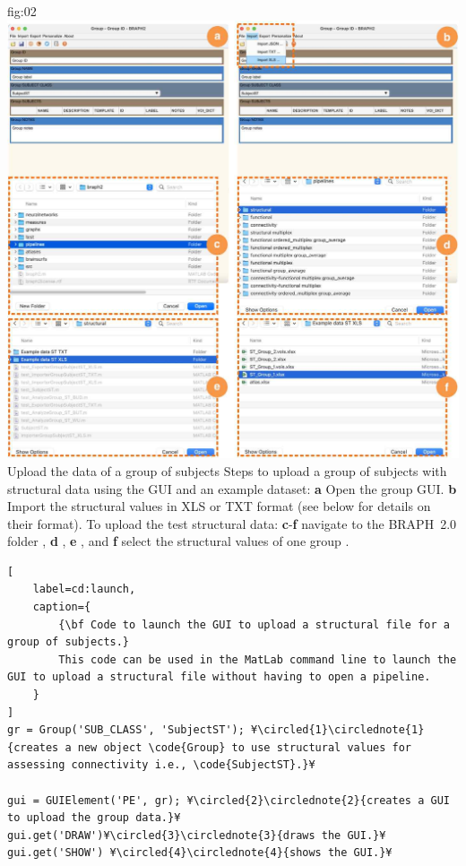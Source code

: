 \documentclass[justified]{tufte-handout}
\begin{document}
	{fig:02}
	{
	\includegraphics{fig02.jpg}
	}
	{Upload the data of a group of subjects}
	{
	Steps to upload a group of subjects with structural data using the GUI and an example dataset: 
	{\bf a} Open the group GUI.
	{\bf b} Import the structural values in XLS or TXT format (see below for details on their format).
	To upload the test structural data:
	{\bf c}-{\bf f} navigate to the BRAPH~2.0 folder , {\bf d} ,  {\bf e} , and {\bf f} select the structural values of one group .
	}

%
\begin{lstlisting}[
	label=cd:launch,
	caption={
		{\bf Code to launch the GUI to upload a structural file for a group of subjects.}
		This code can be used in the MatLab command line to launch the GUI to upload a structural file without having to open a pipeline.
	}
]
gr = Group('SUB_CLASS', 'SubjectST'); ¥\circled{1}\circlednote{1}{creates a new object \code{Group} to use structural values for assessing connectivity i.e., \code{SubjectST}.}¥

gui = GUIElement('PE', gr); ¥\circled{2}\circlednote{2}{creates a GUI to upload the group data.}¥
gui.get('DRAW')¥\circled{3}\circlednote{3}{draws the GUI.}¥
gui.get('SHOW') ¥\circled{4}\circlednote{4}{shows the GUI.}¥
\end{lstlisting}
\end{document}
